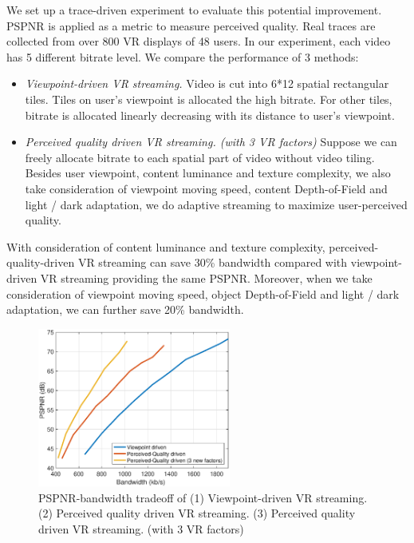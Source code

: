We set up a trace-driven experiment to evaluate this potential improvement. PSPNR \cite{PSPNR} is applied as a metric to measure perceived quality. Real traces are collected from over 800 VR displays of 48 users. In our experiment, each video has 5 different bitrate level. We compare the performance of 3 methods:
\begin{itemize}

\item \emph{Viewpoint-driven VR streaming.} Video is cut into 6*12 spatial rectangular tiles. Tiles on user's viewpoint is allocated the high bitrate. For other tiles, bitrate is allocated linearly decreasing with its distance to user's viewpoint.

\item \emph{Perceived quality driven VR streaming. (with 3 VR factors)} Suppose we can freely allocate bitrate to each spatial part of video without video tiling. Besides user viewpoint, content luminance and texture complexity, we also take consideration of viewpoint moving speed, content Depth-of-Field and light / dark adaptation, we do adaptive streaming to maximize user-perceived quality.

\end{itemize}

With consideration of content luminance and texture complexity, perceived-quality-driven VR streaming can save 30\% bandwidth compared with viewpoint-driven VR streaming providing the same PSPNR. Moreover, when we take consideration of viewpoint moving speed, object Depth-of-Field and light / dark adaptation, we can further save 20\% bandwidth.


\begin{figure}
  \centering
  \includegraphics[width=2.5in]{images/improvement.eps}
  \caption{PSPNR-bandwidth tradeoff of (1) Viewpoint-driven VR streaming. (2) Perceived quality driven VR streaming. (3) Perceived quality driven VR streaming. (with 3 VR factors)}
  \label{potential1}
  \end{figure}




